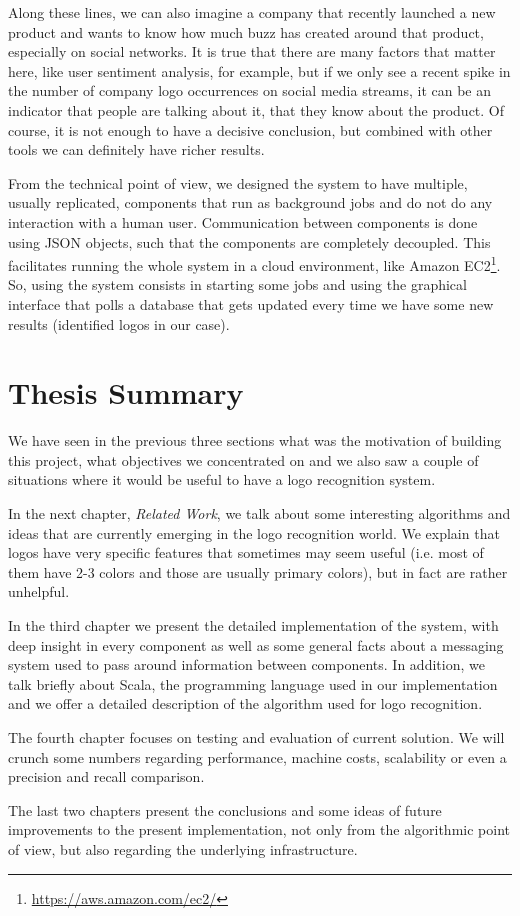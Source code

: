 Along these lines, we can also imagine a company that recently launched a new
product and wants to know how much buzz has created around that product,
especially on social networks. It is true that there are many factors that
matter here, like user sentiment analysis, for example, but if we only see a
recent spike in the number of company logo occurrences on social media
streams, it can be an indicator that people are talking about it, that they
know about the product. Of course, it is not enough to have a decisive
conclusion, but combined with other tools we can definitely have richer
results.

From the technical point of view, we designed the system to have multiple,
usually replicated, components that run as background jobs and do not do any
interaction with a human user. Communication between components is done using
JSON objects, such that the components are completely decoupled. This
facilitates running the whole system in a cloud environment, like Amazon
EC2\footnote{\url{https://aws.amazon.com/ec2/}}. So, using the system consists
in starting some jobs and using the graphical interface that polls a database
that gets updated every time we have some new results (identified logos in our
case).

\section{Thesis Summary}

We have seen in the previous three sections what was the motivation of
building this project, what objectives we concentrated on and we also saw
a couple of situations where it would be useful to have a logo recognition
system.

In the next chapter, \textit{Related Work}, we talk about some
interesting algorithms and ideas that are currently emerging in the logo
recognition world. We explain that logos have very specific features that
sometimes may seem useful (i.e. most of them have 2-3 colors and those are
usually primary colors), but in fact are rather unhelpful.

In the third chapter we present the detailed implementation of the system,
with deep insight in every component as well as some general facts about a
messaging system used to pass around information between components. In
addition, we talk briefly about Scala, the programming language used in our
implementation and we offer a detailed description of the algorithm used
for logo recognition.

The fourth chapter focuses on testing and evaluation of current solution. We
will crunch some numbers regarding performance, machine costs, scalability or
even a precision and recall comparison.

The last two chapters present the conclusions and some ideas of future improvements to the present
implementation, not only from the algorithmic point of view, but also
regarding the underlying infrastructure.
